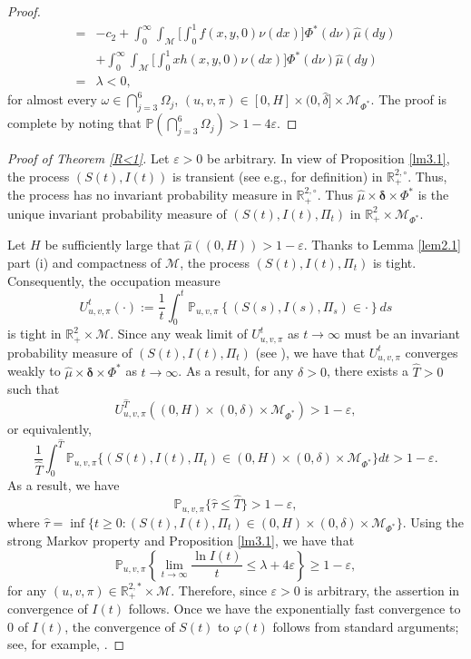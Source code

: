 \documentclass[12pt]{amsart}
\theoremstyle{remark}
\numberwithin{equation}{section}
\newcommand{\eps}{\varepsilon}
\newcommand{\M}{\mathcal{M}}
\newcommand{\PP}{\mathbb{P}}
\newcommand{\R}{\mathbb{R}}
\numberwithin{equation}{section}
\newcommand{\PPi}{\PP_{u,v,\pi}}
\newcommand{\1}{\boldsymbol{1}}
\newcommand{\bdelta}{\boldsymbol{\delta}}
\def\hat{\widehat}
\begin{document}
\begin{proof}
$$\begin{aligned}
=&-c_2 +\int_0^\infty \!\int_\M\!\Big[\int_0^1f(x,y,0)\nu(dx)\!\Big]\Phi^*(d\nu)\hat\mu(dy)\\
&+\int_0^\infty\int_{\M} \Big[\int_0^1 xh(x,y,0)\nu(dx)\Big]\Phi^*(d\nu)\hat\mu(dy)\\
=&\lambda<0,
\end{aligned}
$$
for almost every $\omega\in \bigcap_{j=3}^6\Omega_j$, $(u,v ,\pi)\in [0,H]\times (0,\hat\delta]\times\M_{\Phi^*}$.
The proof is complete by noting that $\PP(\bigcap_{j=3}^6\Omega_j)>1-4\eps$.

\end{proof}


\begin{proof}[Proof of Theorem \ref{R<1}]
	Let $\eps>0$ be arbitrary.
	In view of Proposition \ref{lm3.1},
	the process $(S(t), I(t))$ is transient (see e.g., \cite{WK} for definition) in $\R^{2,\circ}_+$.
	Thus, the process has no invariant probability measure in $\R^{2,\circ}_+$.
	Thus $\hat\mu\times\bdelta\times\Phi^*$
	is the unique invariant probability measure of $(S(t), I(t), \Pi_t)$   in $\R^2_+\times\M_{\Phi^*}$.
	
	Let $H$ be sufficiently large that $\hat\mu((0,H))>1-\eps$.
	Thanks to Lemma \ref{lem2.1} part (i) and compactness of $\M$, the process  $(S(t), I(t), \Pi_t)$ is tight. Consequently,
	the occupation measure
	$$U^t_{u,v,\pi}(\cdot):=\dfrac1t\int_0^t\PPi\left\{(S(s),I(s),\Pi_s)\in\cdot\right\}ds$$
	is tight in $\R^2_+\times\M$.
	Since any weak limit of $U^t_{u,v,\pi}$ as $t\to\infty$ must be an invariant probability measure of $(S(t),I(t),\Pi_t)$ (see \cite{HN18}),
	we have that
	$U^t_{u,v,\pi}$ converges weakly to $\hat\mu\times\bdelta\times\Phi^*$ as $t\to\infty$.
	As a result, for any $\delta>0$, there exists a  $\hat T>0$ such that
	$$U^{\hat T}_{u,v,\pi}((0,H)\times(0,\delta)\times\M_{\Phi^*})>1-\eps,$$
	or equivalently,
	$$\dfrac1{\hat T}\int_0^{\hat T}\PPi\{(S(t),I(t),\Pi_t)\in (0,H)\times(0,\delta)\times \M_{\Phi^*}\}dt>1-\eps.$$
As a result, we have
	$$\PPi\{\hat\tau\leq\hat T\}>1-\eps,$$
	where $\hat\tau=\inf\{t\geq 0: (S(t),I(t),\Pi_t)\in (0,H)\times(0,\delta)\times \M_{\Phi^*}\}$.
	Using the strong Markov property and Proposition \ref{lm3.1},
	we have that
	$$
	\PPi\left\{\lim_{t\to\infty}\dfrac{\ln I(t)}t\leq \lambda+4\eps\right\}\geq 1-\eps,
	$$
	for any $(u,v,\pi)\in\R^{2,*}_+\times\M$. Therefore, since $\eps > 0$ is arbitrary, the assertion in convergence of $I(t)$ follows.
Once we have the exponentially fast convergence to $0$ of $I(t)$, the convergence of $S(t)$ to $\varphi(t)$ follows from standard arguments; see, for example, \cite{DANG,DN-JDE}.
\end{proof}
\end{document}
